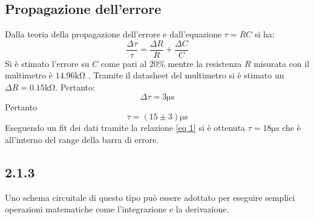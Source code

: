 \subsection{Propagazione dell'errore}
Dalla teoria della propagazione dell'errore e dall'equazione $\tau=RC$ si ha:
\begin{equation}
    \frac{\Delta\tau}{\tau}=\frac{\Delta R}{R}+\frac{\Delta C}{C}
\end{equation}
Si è stimato l'errore su $C$ come pari al $20\%$ mentre la resistenza $R$ misurata con il multimetro è $14.96$\unit{\kohm} . Tramite il datasheet del multimetro si è stimato un $\Delta R = 0.15 $\unit{\kohm}. Pertanto:
\begin{equation}
    \Delta \tau = 3\unit{\us}
\end{equation}
Pertanto 
\begin{equation*}
    \tau=(15\pm 3) \unit{\us}
\end{equation*}
Eseguendo un fit dei dati tramite la relazione \ref{eq 1} si è ottenuta $\tau=18\unit{\us}$ che è all'interno del range della barra di errore.
\subsection{2.1.3}
Uno schema circuitale di questo tipo può essere adottato per eseguire semplici operazioni matematiche come l'integrazione e la derivazione.
